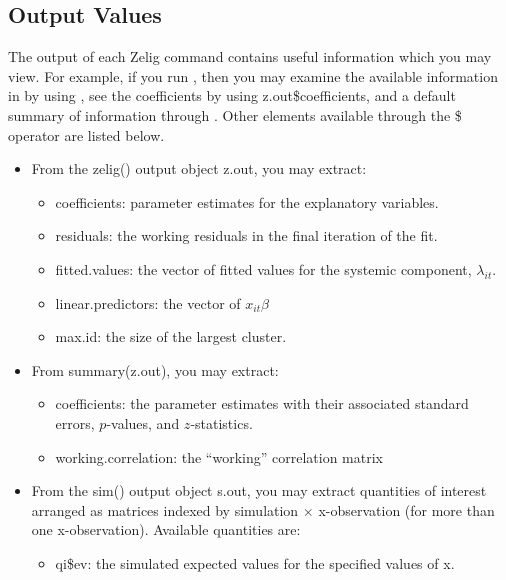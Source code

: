 \documentclass[letterpaper,10pt,english]{sphinxmanual}
\begin{document}
\subsection{Output Values}
\label{vignette:id147}
The output of each Zelig command contains useful information which you
may view. For example, if you run
, then you may
examine the available information in  by using
, see the coefficients by using z.out\$coefficients, and
a default summary of information through . Other
elements available through the \$ operator are listed below.
\begin{itemize}
\item {} 
From the zelig() output object z.out, you may extract:
\begin{itemize}
\item {} 
coefficients: parameter estimates for the explanatory variables.

\item {} 
residuals: the working residuals in the final iteration of the
fit.

\item {} 
fitted.values: the vector of fitted values for the systemic
component, \(\lambda_{it}\).

\item {} 
linear.predictors: the vector of \(x_{it}\beta\)

\item {} 
max.id: the size of the largest cluster.

\end{itemize}

\item {} 
From summary(z.out), you may extract:
\begin{itemize}
\item {} 
coefficients: the parameter estimates with their associated
standard errors, \(p\)-values, and \(z\)-statistics.

\item {} 
working.correlation: the “working” correlation matrix

\end{itemize}

\item {} 
From the sim() output object s.out, you may extract quantities of
interest arranged as matrices indexed by simulation \(\times\)
x-observation (for more than one x-observation). Available quantities
are:
\begin{itemize}
\item {} 
qi\$ev: the simulated expected values for the specified values of
x.


\end{itemize}
\end{itemize}
\end{document}
